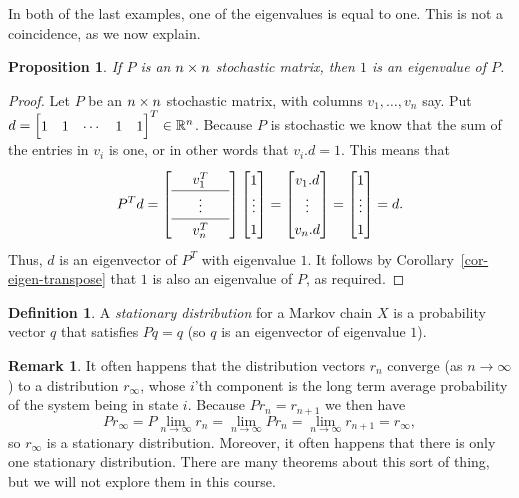 \documentclass[reqno]{amsart}
\newtheorem{proposition}[theorem]{Proposition}
\theoremstyle{definition}
\newtheorem{remark}[theorem]{Remark}
\newtheorem{definition}[theorem]{Definition}
\newcommand{\dfn}[1]{\emph{{#1}}\index{#1}}
\begin{document}
In both of the last examples, one of the eigenvalues is equal to one.
This is not a coincidence, as we now explain.

\begin{proposition}\label{prop-stochastic-eigenvalue}
 If $P$ is an $n\times n$ stochastic matrix, then $1$ is an eigenvalue of
 $P$.
\end{proposition}
\begin{proof}
 Let $P$ be an $n\times n$ stochastic matrix, with columns
 $v_1,\dotsc,v_n$ say.  Put $d=\bbm 1&1&\cdots&1&1\ebm^T\in\R^n$.
 Because $P$ is stochastic we know that the sum of the entries in
 $v_i$ is one, or in other words that $v_i.d=1$.  This means that
 \[ \renewcommand{\arraystretch}{1.3}
  P^Td
  = \left[\begin{array}{ccc}
     & v_1^T  & \\ \hline
     & \vdots & \\ \hline
     & v_n^T  &
    \end{array}\right]
    \bbm 1 \\ \vdots \\ 1 \ebm
  = \bbm v_1.d \\ \vdots \\ v_n.d \ebm
  = \bbm 1 \\ \vdots \\ 1 \ebm
  = d.
 \]
 Thus, $d$ is an eigenvector of $P^T$ with eigenvalue $1$.  It follows
 by Corollary~\ref{cor-eigen-transpose} that $1$ is also an eigenvalue
 of $P$, as required.
\end{proof}

\begin{definition}\label{defn-stationary}
 A \dfn{stationary distribution} for a Markov chain $X$ is a
 probability vector $q$ that satisfies $Pq=q$ (so $q$ is an
 eigenvector of eigenvalue $1$).
\end{definition}

\begin{remark}\label{rem-stationary}
 It often happens that the distribution vectors $r_n$ converge (as
 $n\to\infty$) to a distribution $r_{\infty}$, whose $i$'th component
 is the long term average probability of the system being in state
 $i$.  Because $Pr_n=r_{n+1}$ we then have
 \[ P r_\infty = P\lim_{n\to\infty} r_n =
     \lim_{n\to\infty} Pr_n = \lim_{n\to\infty} r_{n+1} = r_\infty,
 \]
 so $r_\infty$ is a stationary distribution.  Moreover, it often
 happens that there is only one stationary distribution.  There
 are many theorems about this sort of thing, but we will not explore
 them in this course.
\end{remark}
\end{document}
